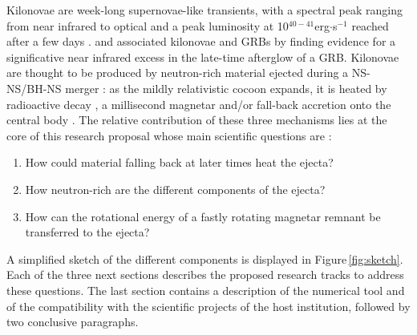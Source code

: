 \documentclass[12pt,onecolumn]{article}
\makeatletter
\newcommand{\grb}{GRB\xspace}
\newcommand{\grbs}{GRBs\xspace}
\newcommand*{\ns}{NS\@\xspace}
\newcommand*{\bh}{BH\@\xspace}
\makeatother
\begin{document}
Kilonovae are week-long supernovae-like transients, with a spectral peak ranging from near infrared to optical and a peak luminosity at 10$^{40-41}$erg$\cdot$s$^{-1}$ reached after a few days \citep{Tanaka2016,Metzger2017}. \citet{Tanvir2013} and \citet{Berger2013} associated kilonovae and \grbs by finding evidence for a significative near infrared excess in the late-time afterglow of a \grb. Kilonovae are thought to be produced by neutron-rich material ejected during a \ns-\ns/\bh-\ns merger : as the mildly relativistic cocoon expands, it is heated by radioactive decay \citep{Li1998}, a millisecond magnetar \citep{Yu2013} and/or fall-back accretion onto the central body \citep{Rosswog2007}. The relative contribution of these three mechanisms lies at the core of this research proposal whose main scientific questions are :

\begin{enumerate}[itemsep=0mm]
\item How could material falling back at later times heat the ejecta?
\item How neutron-rich are the different components of the ejecta?
\item How can the rotational energy of a fastly rotating magnetar remnant be transferred to the ejecta?
\end{enumerate}

A simplified sketch of the different components is displayed in Figure\,\ref{fig:sketch}. Each of the three next sections describes the proposed research tracks to address these questions. The last section contains a description of the numerical tool and of the compatibility with the scientific projects of the host institution, followed by two conclusive paragraphs.
\end{document}
